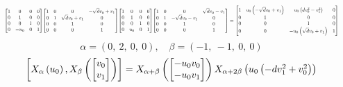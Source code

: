 \documentclass[11pt]{article}
\theoremstyle{definition}
\begin{document}
\[
\scaletoalign{\textwidth}{{\left[\begin{matrix}1 & 0 & 0 & 0\\0 & 1 & 0 & 0\\0 & 0 & 1 & 0\\0 & - u_{0} & 0 & 1\end{matrix}\right]} {\left[\begin{matrix}1 & 0 & 0 & - \sqrt{d} v_{0} + v_{1}\\0 & 1 & \sqrt{d} v_{0} + v_{1} & 0\\0 & 0 & 1 & 0\\0 & 0 & 0 & 1\end{matrix}\right]} {\left[\begin{matrix}1 & 0 & 0 & 0\\0 & 1 & 0 & 0\\0 & 0 & 1 & 0\\0 & u_{0} & 0 & 1\end{matrix}\right]} {\left[\begin{matrix}1 & 0 & 0 & \sqrt{d} v_{0} - v_{1}\\0 & 1 & - \sqrt{d} v_{0} - v_{1} & 0\\0 & 0 & 1 & 0\\0 & 0 & 0 & 1\end{matrix}\right]} = {\left[\begin{matrix}1 & u_{0} \left(- \sqrt{d} v_{0} + v_{1}\right) & u_{0} \left(d v_{0}^{2} - v_{1}^{2}\right) & 0\\0 & 1 & 0 & 0\\0 & 0 & 1 & 0\\0 & 0 & - u_{0} \left(\sqrt{d} v_{0} + v_{1}\right) & 1\end{matrix}\right]}}
\]
\[
\alpha = \left( 0, \  2, \  0, \  0\right), \quad \beta = \left( -1, \  -1, \  0, \  0\right)
\]
\[
\scaletoalign{\textwidth}{\left[ X_{\alpha}\left(u_{0}\right), X_{\beta}\left(\left[\begin{matrix}v_{0}\\v_{1}\end{matrix}\right]\right) \right] = X_{\alpha + \beta}\left(\left[\begin{matrix}- u_{0} v_{0}\\- u_{0} v_{1}\end{matrix}\right]\right) X_{\alpha + 2\beta}\left(u_{0} \left(- d v_{1}^{2} + v_{0}^{2}\right)\right)}
\]
\end{document}

